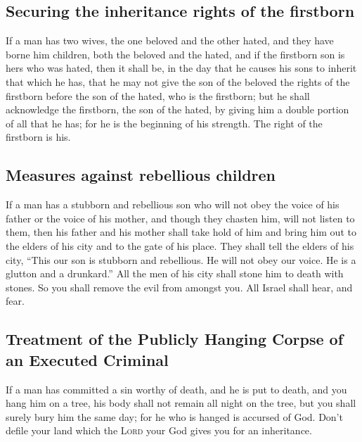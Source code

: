\hypertarget{securing-the-inheritance-rights-of-the-firstborn}{%
\subsection{Securing the inheritance rights of the
firstborn}\label{securing-the-inheritance-rights-of-the-firstborn}}

 If a man has two wives, the one beloved and the other
hated, and they have borne him children, both the beloved and the hated,
and if the firstborn son is hers who was hated,  then it
shall be, in the day that he causes his sons to inherit that which he
has, that he may not give the son of the beloved the rights of the
firstborn before the son of the hated, who is the firstborn;
 but he shall acknowledge the firstborn, the son of the
hated, by giving him a double portion of all that he has; for he is the
beginning of his strength. The right of the firstborn is his.

\hypertarget{measures-against-rebellious-children}{%
\subsection{Measures against rebellious
children}\label{measures-against-rebellious-children}}

 If a man has a stubborn and rebellious son who will not
obey the voice of his father or the voice of his mother, and though they
chasten him, will not listen to them,  then his father
and his mother shall take hold of him and bring him out to the elders of
his city and to the gate of his place.  They shall tell
the elders of his city, ``This our son is stubborn and rebellious. He
will not obey our voice. He is a glutton and a drunkard.''
 All the men of his city shall stone him to death with
stones. So you shall remove the evil from amongst you. All Israel shall
hear, and fear.

\hypertarget{treatment-of-the-publicly-hanging-corpse-of-an-executed-criminal}{%
\subsection{Treatment of the Publicly Hanging Corpse of an Executed
Criminal}\label{treatment-of-the-publicly-hanging-corpse-of-an-executed-criminal}}

 If a man has committed a sin worthy of death, and he is
put to death, and you hang him on a tree,  his body shall
not remain all night on the tree, but you shall surely bury him the same
day; for he who is hanged is accursed of God. Don't defile your land
which the \textsc{Lord} your God gives you for an inheritance.

